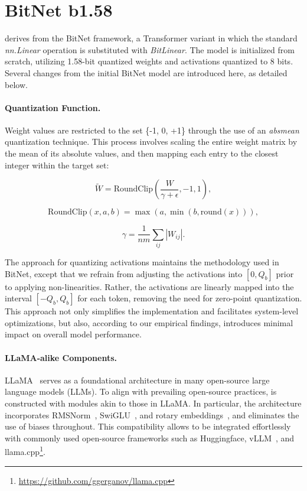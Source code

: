 \section{BitNet b1.58}

 derives from the BitNet framework, a Transformer variant in which the standard \emph{nn.Linear} operation is substituted with \emph{BitLinear}. The model is initialized from scratch, utilizing 1.58-bit quantized weights and activations quantized to 8 bits. Several changes from the initial BitNet model are introduced here, as detailed below.

\paragraph{Quantization Function.} Weight values are restricted to the set \{-1, 0, +1\} through the use of an \emph{absmean} quantization technique. This process involves scaling the entire weight matrix by the mean of its absolute values, and then mapping each entry to the closest integer within the target set:

\begin{equation}
    \widetilde{W} = \mathrm{RoundClip}(\frac{W}{\gamma + \epsilon}, -1, 1),
\end{equation}

\begin{equation}
    \mathrm{RoundClip}(x, a, b) = \max(a, \min(b, \mathrm{round}(x))),
\end{equation}

\begin{equation}
    \gamma = \frac{1}{nm}\sum_{ij} |W_{ij}|.
\end{equation}

The approach for quantizing activations maintains the methodology used in BitNet, except that we refrain from adjusting the activations into $[0, Q_b]$ prior to applying non-linearities. Rather, the activations are linearly mapped into the interval $[-Q_b, Q_b]$ for each token, removing the need for zero-point quantization. This approach not only simplifies the implementation and facilitates system-level optimizations, but also, according to our empirical findings, introduces minimal impact on overall model performance.

\paragraph{LLaMA-alike Components.}

LLaMA~\cite{llama, llama2} serves as a foundational architecture in many open-source large language models (LLMs). To align with prevailing open-source practices,  is constructed with modules akin to those in LLaMA. In particular, the architecture incorporates RMSNorm~\cite{rmsnorm}, SwiGLU~\cite{swiglu}, and rotary embeddings~\cite{rope}, and eliminates the use of biases throughout. This compatibility allows  to be integrated effortlessly with commonly used open-source frameworks such as Huggingface, vLLM~\cite{vllm}, and llama.cpp\footnote{\url{https://github.com/ggerganov/llama.cpp}}.

